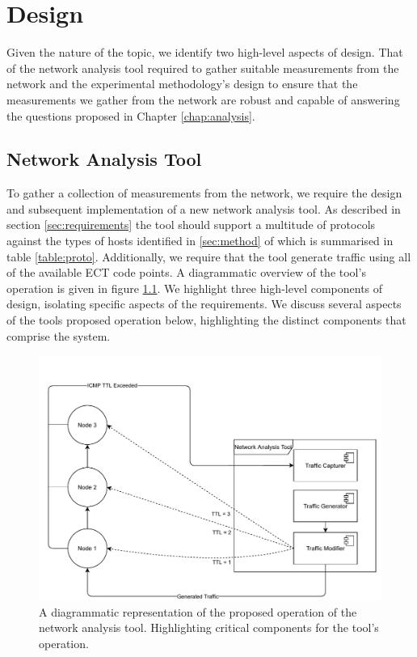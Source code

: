\documentclass{l4proj}
\begin{document}
\chapter{Design}
\label{chap:design}

Given the nature of the topic, we identify two high-level aspects of design. That of the network analysis tool required to gather suitable measurements from the network and the experimental methodology's design to ensure that the measurements we gather from the network are robust and capable of answering the questions proposed in Chapter \ref{chap:analysis}.

\section{Network Analysis Tool}
\label{sec:tooldesign}

To gather a collection of measurements from the network, we require the design and subsequent implementation of a new network analysis tool. As described in section \ref{sec:requirements} the tool should support a multitude of protocols against the types of hosts identified in \ref{sec:method} of which is summarised in table \ref{table:proto}. Additionally, we require that the tool generate traffic using all of the available ECT code points. A diagrammatic overview of the tool's operation is given in figure \ref{fig:tooldesign}. We highlight three high-level components of design, isolating specific aspects of the requirements. We discuss several aspects of the tools proposed operation below, highlighting the distinct components that comprise the system.


\begin{figure}[H]
\centering
\includegraphics[width=14cm]{dissertation/images/sys_arch.pdf}
\caption{A diagrammatic representation of the proposed operation of the network analysis tool. Highlighting critical components for the tool's operation.}
\label{fig:tooldesign}
\end{figure}
\end{document}
